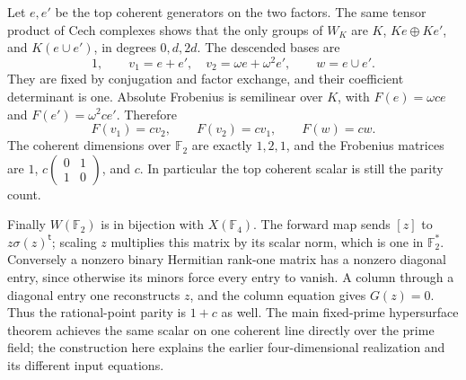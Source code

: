 Let $e,e'$ be the top coherent generators on the two factors. The same tensor product of Cech complexes shows that the only groups of $W_K$ are $K$, $Ke\oplus Ke'$, and $K(e\cup e')$, in degrees $0,d,2d$. The descended bases are
\[
 1,\qquad v_1=e+e',\quad v_2=\omega e+\omega^2e',
 \qquad w=e\cup e'.
\]
They are fixed by conjugation and factor exchange, and their coefficient determinant is one. Absolute Frobenius is semilinear over $K$, with
$F(e)=\omega c e$ and $F(e')=\omega^2c e'$. Therefore
\[
 F(v_1)=cv_2,\qquad F(v_2)=cv_1,\qquad F(w)=cw.
\]
The coherent dimensions over $\mathbb F_2$ are exactly $1,2,1$, and the Frobenius matrices are $1$, $c\left(\begin{smallmatrix}0&1\\1&0\end{smallmatrix}\right)$, and $c$. In particular the top coherent scalar is still the parity count.

Finally $W(\mathbb F_2)$ is in bijection with $X(\mathbb F_4)$. The forward map sends $[z]$ to $z\sigma(z)^{\mathsf t}$; scaling $z$ multiplies this matrix by its scalar norm, which is one in $\mathbb F_2^*$. Conversely a nonzero binary Hermitian rank-one matrix has a nonzero diagonal entry, since otherwise its minors force every entry to vanish. A column through a diagonal entry one reconstructs $z$, and the column equation gives $G(z)=0$. Thus the rational-point parity is $1+c$ as well. The main fixed-prime hypersurface theorem achieves the same scalar on one coherent line directly over the prime field; the construction here explains the earlier four-dimensional realization and its different input equations.
